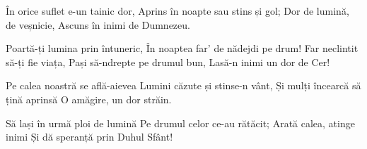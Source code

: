 \beginverse
În orice suflet e-un tainic dor,
Aprins în noapte sau stins și gol;
Dor de lumină, de veșnicie,
Ascuns în inimi de Dumnezeu.
\endverse

\beginchorus
Poartă-ți lumina prin întuneric,
În noaptea far’ de nădejdi pe drum!
Far neclintit să-ți fie viața,
Pași să-ndrepte pe drumul bun,
Lasă-n inimi un dor de Cer!
\endchorus

\beginverse
Pe calea noastră se află-aievea
Lumini căzute și stinse-n vânt,
Și mulți încearcă să țină aprinsă
O amăgire, un dor străin.
\endverse

\beginverse
Să lași în urmă ploi de lumină
Pe drumul celor ce-au rătăcit;
Arată calea, atinge inimi
Și dă speranță prin Duhul Sfânt!
\endverse
\endsong